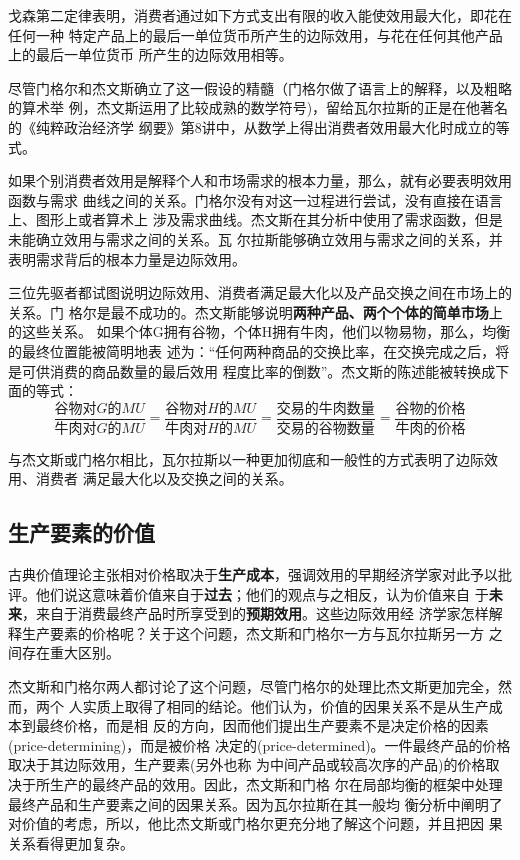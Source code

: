 戈森第二定律表明，消费者通过如下方式支出有限的收入能使效用最大化，即花在任何一种
特定产品上的最后一单位货币所产生的边际效用，与花在任何其他产品上的最后一单位货币
所产生的边际效用相等。

尽管门格尔和杰文斯确立了这一假设的精髓（门格尔做了语言上的解释，以及粗略的算术举
例，杰文斯运用了比较成熟的数学符号)，留给瓦尔拉斯的正是在他著名的《纯粹政治经济学
纲要》第8讲中，从数学上得出消费者效用最大化时成立的等式。

如果个别消费者效用是解释个人和市场需求的根本力量，那么，就有必要表明效用函数与需求
曲线之间的关系。门格尔没有对这一过程进行尝试，没有直接在语言上、图形上或者算术上
涉及需求曲线。杰文斯在其分析中使用了需求函数，但是未能确立效用与需求之间的关系。瓦
尔拉斯能够确立效用与需求之间的关系，并表明需求背后的根本力量是边际效用。

三位先驱者都试图说明边际效用、消费者满足最大化以及产品交换之间在市场上的关系。门
格尔是最不成功的。杰文斯能够说明\textbf{两种产品、两个个体的简单市场}上的这些关系。
如果个体G拥有谷物，个体H拥有牛肉，他们以物易物，那么，均衡的最终位置能被简明地表
述为：“任何两种商品的交换比率，在交换完成之后，将是可供消费的商品数量的最后效用
程度比率的倒数”。杰文斯的陈述能被转换成下面的等式：
\[ \frac{谷物对G的MU}{牛肉对G的MU} = \frac{谷物对H的MU}{牛肉对H的MU} = \frac{交
    易的牛肉数量}{交易的谷物数量} = \frac{谷物的价格}{牛肉的价格} \]

与杰文斯或门格尔相比，瓦尔拉斯以一种更加彻底和一般性的方式表明了边际效用、消费者
满足最大化以及交换之间的关系。

\subsection{生产要素的价值}

古典价值理论主张相对价格取决于\textbf{生产成本}，强调效用的早期经济学家对此予以批
评。他们说这意味着价值来自于\textbf{过去}；他们的观点与之相反，认为价值来自
于\textbf{未来}，来自于消费最终产品时所享受到的\textbf{预期效用}。这些边际效用经
济学家怎样解释生产要素的价格呢？关于这个问题，杰文斯和门格尔一方与瓦尔拉斯另一方
之间存在重大区别。

杰文斯和门格尔两人都讨论了这个问题，尽管门格尔的处理比杰文斯更加完全，然而，两个
人实质上取得了相同的结论。他们认为，价值的因果关系不是从生产成本到最终价格，而是相
反的方向，因而他们提出生产要素不是决定价格的因素(price-determining)，而是被价格
决定的(price-determined)。一件最终产品的价格取决于其边际效用，生产要素(另外也称
为中间产品或较高次序的产品)的价格取决于所生产的最终产品的效用。因此，杰文斯和门格
尔在局部均衡的框架中处理最终产品和生产要素之间的因果关系。因为瓦尔拉斯在其一般均
衡分析中阐明了对价值的考虑，所以，他比杰文斯或门格尔更充分地了解这个问题，并且把因
果关系看得更加复杂。

